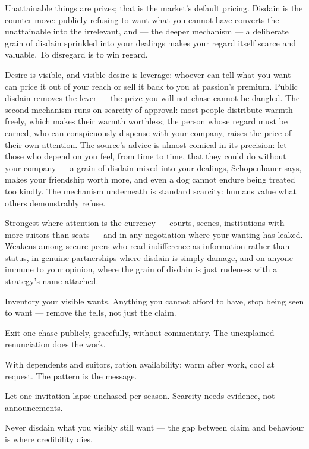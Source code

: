 \begin{core}
Unattainable things are prizes; that is the market's default pricing. Disdain is the counter-move: publicly refusing to want what you cannot have converts the unattainable into the irrelevant, and --- the deeper mechanism --- a deliberate grain of disdain sprinkled into your dealings makes your regard itself scarce and valuable. To disregard is to win regard.
\end{core}
\begin{mechanism}
Desire is visible, and visible desire is leverage: whoever can tell what you want can price it out of your reach or sell it back to you at passion's premium. Public disdain removes the lever --- the prize you will not chase cannot be dangled. The second mechanism runs on scarcity of approval: most people distribute warmth freely, which makes their warmth worthless; the person whose regard must be earned, who can conspicuously dispense with your company, raises the price of their own attention. The source's advice is almost comical in its precision: let those who depend on you feel, from time to time, that they could do without your company --- a grain of disdain mixed into your dealings, Schopenhauer says, makes your friendship worth more, and even a dog cannot endure being treated too kindly. The mechanism underneath is standard scarcity: humans value what others demonstrably refuse.
\end{mechanism}
\begin{conditions}
Strongest where attention is the currency --- courts, scenes, institutions with more suitors than seats --- and in any negotiation where your wanting has leaked. Weakens among secure peers who read indifference as information rather than status, in genuine partnerships where disdain is simply damage, and on anyone immune to your opinion, where the grain of disdain is just rudeness with a strategy's name attached.
\end{conditions}
\begin{application}
  \item Inventory your visible wants. Anything you cannot afford to have, stop being seen to want --- remove the tells, not just the claim.
  \item Exit one chase publicly, gracefully, without commentary. The unexplained renunciation does the work.
  \item With dependents and suitors, ration availability: warm after work, cool at request. The pattern is the message.
  \item Let one invitation lapse unchased per season. Scarcity needs evidence, not announcements.
  \item Never disdain what you visibly still want --- the gap between claim and behaviour is where credibility dies.
\end{application}
